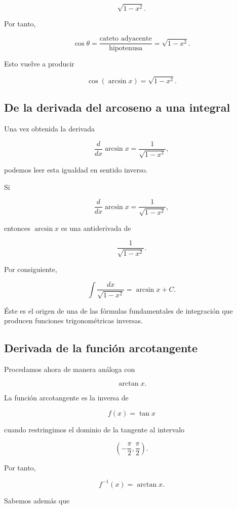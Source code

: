 \documentclass[12pt]{article}
\theoremstyle{definition}
\theoremstyle{remark}
\begin{document}
\[
\sqrt{1-x^2}.
\]

Por tanto,

\[
\cos\theta
=
\frac{\text{cateto adyacente}}
     {\text{hipotenusa}}
=
\sqrt{1-x^2}.
\]

Esto vuelve a producir

\[
\cos(\arcsin x)
=
\sqrt{1-x^2}.
\]

\subsection{De la derivada del arcoseno a una integral}

Una vez obtenida la derivada

\[
\frac{d}{dx}\arcsin x
=
\frac{1}{\sqrt{1-x^2}},
\]

podemos leer esta igualdad en sentido inverso.

Si

\[
\frac{d}{dx}\arcsin x
=
\frac{1}{\sqrt{1-x^2}},
\]

entonces $\arcsin x$ es una antiderivada de

\[
\frac{1}{\sqrt{1-x^2}}.
\]

Por consiguiente,

\[
\boxed{
\int\frac{dx}{\sqrt{1-x^2}}
=
\arcsin x+C.
}
\]

Éste es el origen de una de las fórmulas fundamentales de integración
que producen funciones trigonométricas inversas.

\subsection{Derivada de la función arcotangente}

Procedamos ahora de manera análoga con

\[
\arctan x.
\]

La función arcotangente es la inversa de

\[
f(x)=\tan x
\]

cuando restringimos el dominio de la tangente al intervalo

\[
\left(-\frac{\pi}{2},\frac{\pi}{2}\right).
\]

Por tanto,

\[
f^{-1}(x)=\arctan x.
\]

Sabemos además que
\end{document}
